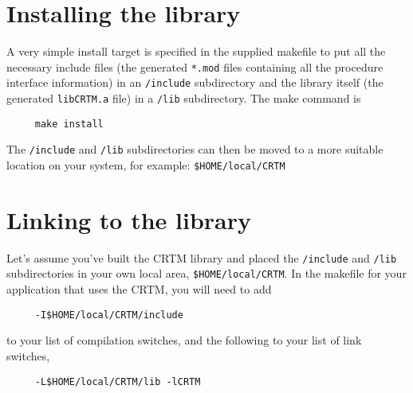      
\section{Installing the library}
A very simple install target is specified in the supplied makefile to put all the necessary include files (the generated \texttt{*.mod} files containing all the procedure interface information) in an \texttt{/include} subdirectory and the library itself (the generated \texttt{libCRTM.a} file) in a \texttt{/lib} subdirectory. The make command is
\begin{verbatim}     make install\end{verbatim}
The \texttt{/include} and \texttt{/lib} subdirectories can then be moved to a more suitable location on your system, for example: \texttt{\$HOME/local/CRTM}


\section{Linking to the library}
Let's assume you've built the CRTM library and placed the \texttt{/include} and \texttt{/lib} subdirectories in your own local area, \texttt{\$HOME/local/CRTM}. In the makefile for your application that uses the CRTM, you will need to add
\begin{verbatim}     -I$HOME/local/CRTM/include\end{verbatim}
to your list of compilation switches, and the following to your list of link switches,
\begin{verbatim}     -L$HOME/local/CRTM/lib -lCRTM\end{verbatim}

